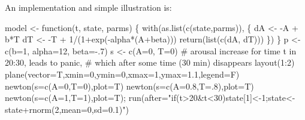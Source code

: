 \documentclass[
  a4paper,
  DIV=11,
  numbers=noendperiod,
  oneside]{scrreprt}
\newenvironment{Shaded}{}{}
\newcommand{\AttributeTok}[1]{\textcolor[rgb]{0.84,0.23,0.29}{#1}}
\newcommand{\CommentTok}[1]{\textcolor[rgb]{0.42,0.45,0.49}{#1}}
\newcommand{\ControlFlowTok}[1]{\textcolor[rgb]{0.84,0.23,0.29}{#1}}
\newcommand{\DecValTok}[1]{\textcolor[rgb]{0.00,0.36,0.77}{#1}}
\newcommand{\FloatTok}[1]{\textcolor[rgb]{0.00,0.36,0.77}{#1}}
\newcommand{\FunctionTok}[1]{\textcolor[rgb]{0.44,0.26,0.76}{#1}}
\newcommand{\NormalTok}[1]{\textcolor[rgb]{0.14,0.16,0.18}{#1}}
\newcommand{\OtherTok}[1]{\textcolor[rgb]{0.44,0.26,0.76}{#1}}
\newcommand{\SpecialCharTok}[1]{\textcolor[rgb]{0.00,0.36,0.77}{#1}}
\newcommand{\StringTok}[1]{\textcolor[rgb]{0.01,0.18,0.38}{#1}}
\begin{document}
An implementation and simple illustration is:

\begin{Shaded}
\begin{Highlighting}[]
\NormalTok{model }\OtherTok{\textless{}{-}} \ControlFlowTok{function}\NormalTok{(t, state, parms) \{}
  \FunctionTok{with}\NormalTok{(}\FunctionTok{as.list}\NormalTok{(}\FunctionTok{c}\NormalTok{(state,parms)), \{}
\NormalTok{    dA }\OtherTok{\textless{}{-}} \SpecialCharTok{{-}}\NormalTok{A }\SpecialCharTok{+}\NormalTok{ b}\SpecialCharTok{*}\NormalTok{T  }
\NormalTok{    dT }\OtherTok{\textless{}{-}} \SpecialCharTok{{-}}\NormalTok{T }\SpecialCharTok{+} \DecValTok{1}\SpecialCharTok{/}\NormalTok{(}\DecValTok{1}\SpecialCharTok{+}\FunctionTok{exp}\NormalTok{(}\SpecialCharTok{{-}}\NormalTok{alpha}\SpecialCharTok{*}\NormalTok{(A}\SpecialCharTok{+}\NormalTok{beta)))}
    \FunctionTok{return}\NormalTok{(}\FunctionTok{list}\NormalTok{(}\FunctionTok{c}\NormalTok{(dA, dT)))}
\NormalTok{  \})}
\NormalTok{\}}
\NormalTok{p }\OtherTok{\textless{}{-}} \FunctionTok{c}\NormalTok{(}\AttributeTok{b=}\DecValTok{1}\NormalTok{, }\AttributeTok{alpha=}\DecValTok{12}\NormalTok{, }\AttributeTok{beta=}\SpecialCharTok{{-}}\NormalTok{.}\DecValTok{7}\NormalTok{) }
\NormalTok{s }\OtherTok{\textless{}{-}} \FunctionTok{c}\NormalTok{(}\AttributeTok{A=}\DecValTok{0}\NormalTok{, }\AttributeTok{T=}\DecValTok{0}\NormalTok{) }
\CommentTok{\# arousal increase for time t in 20:30, leads to panic, }
\CommentTok{\# which after some time (\textquotesingle{}30 min\textquotesingle{}) disappears}
\FunctionTok{layout}\NormalTok{(}\DecValTok{1}\SpecialCharTok{:}\DecValTok{2}\NormalTok{)}
\FunctionTok{plane}\NormalTok{(}\AttributeTok{vector=}\NormalTok{T,}\AttributeTok{xmin=}\DecValTok{0}\NormalTok{,}\AttributeTok{ymin=}\DecValTok{0}\NormalTok{,}\AttributeTok{xmax=}\DecValTok{1}\NormalTok{,}\AttributeTok{ymax=}\FloatTok{1.1}\NormalTok{,}\AttributeTok{legend=}\NormalTok{F) }
\FunctionTok{newton}\NormalTok{(}\AttributeTok{s=}\FunctionTok{c}\NormalTok{(}\AttributeTok{A=}\DecValTok{0}\NormalTok{,}\AttributeTok{T=}\DecValTok{0}\NormalTok{),}\AttributeTok{plot=}\NormalTok{T)}
\FunctionTok{newton}\NormalTok{(}\AttributeTok{s=}\FunctionTok{c}\NormalTok{(}\AttributeTok{A=}\FloatTok{0.8}\NormalTok{,}\AttributeTok{T=}\NormalTok{.}\DecValTok{8}\NormalTok{),}\AttributeTok{plot=}\NormalTok{T)}
\FunctionTok{newton}\NormalTok{(}\AttributeTok{s=}\FunctionTok{c}\NormalTok{(}\AttributeTok{A=}\DecValTok{1}\NormalTok{,}\AttributeTok{T=}\DecValTok{1}\NormalTok{),}\AttributeTok{plot=}\NormalTok{T);}
\FunctionTok{run}\NormalTok{(}\AttributeTok{after=}\StringTok{"if(t\textgreater{}20\&t\textless{}30)state[1]\textless{}{-}1;state\textless{}{-}state+rnorm(2,mean=0,sd=0.1)"}\NormalTok{)}
\end{Highlighting}
\end{Shaded}
\end{document}
